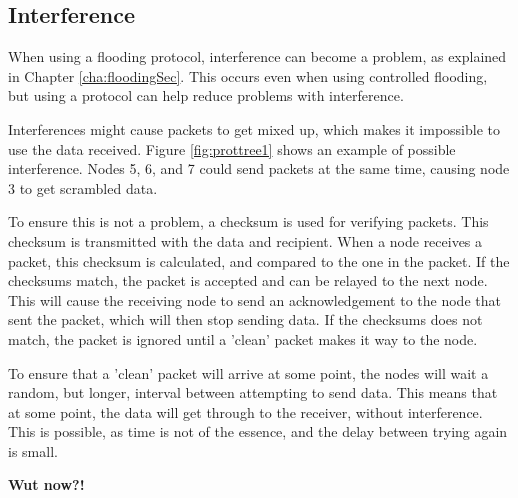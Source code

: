 \subsection*{Interference}
When using a flooding protocol, interference can become a problem, as explained in Chapter \ref{cha:floodingSec}. This occurs even when using controlled flooding, but using a protocol can help reduce problems with interference.

Interferences might cause packets to get mixed up, which makes it impossible to use the data received. Figure \ref{fig:prottree1} shows an example of possible interference. Nodes 5, 6, and 7 could send packets at the same time, causing node 3 to get scrambled data.

To ensure this is not a problem, a checksum is used for verifying packets. This checksum is transmitted with the data and recipient. When a node receives a packet, this checksum is calculated, and compared to the one in the packet. If the checksums match, the packet is accepted and can be relayed to the next node. This will cause the receiving node to send an acknowledgement to the node that sent the packet, which will then stop sending data.
If the checksums does not match, the packet is ignored until a 'clean' packet makes it way to the node.

To ensure that a 'clean' packet will arrive at some point, the nodes will wait a random, but longer, interval between attempting to send data. This means that at some point, the data will get through to the receiver, without interference.
This is possible, as time is not of the essence, and the delay between trying again is small.

\textbf{Wut now?!}
